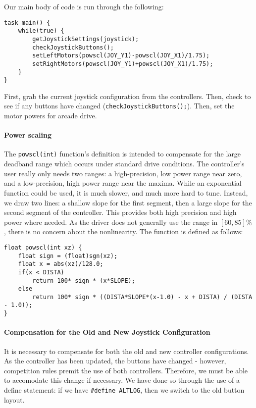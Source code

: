 \documentclass{article}
\begin{document}
Our main body of code is run through the following:

\begin{lstlisting}[tabsize=4]
task main() {
	while(true) {
		getJoystickSettings(joystick);
		checkJoystickButtons();
		setLeftMotors(powscl(JOY_Y1)-powscl(JOY_X1)/1.75);
		setRightMotors(powscl(JOY_Y1)+powscl(JOY_X1)/1.75);
	}
}
\end{lstlisting}

First, grab the current joystick configuration from the controllers. Then, check to see if any buttons have changed (\lstinline{checkJoystickButtons();}{}). Then, set the motor powers for arcade drive. 

\paragraph{Power scaling} The \lstinline{powscl(int)}{} function's definition is intended to compensate for the large deadband range which occurs under standard drive conditions. The controller's user really only needs two ranges: a high-precision, low power range near zero, and a low-precision, high power range near the maxima. While an exponential function could be used, it is much slower, and much more hard to tune. Instead, we draw two lines: a shallow slope for the first segment, then a large slope for the second segment of the controller. This provides both high precision and high power where needed. As the driver does not generally use the range in $[60,85]\%$, there is no concern about the nonlinearity. The function is defined as follows:

\begin{lstlisting}[tabsize=4]
float powscl(int xz) {
	float sign = (float)sgn(xz);
	float x = abs(xz)/128.0;
	if(x < DISTA)
		return 100* sign * (x*SLOPE);
	else
		return 100* sign * ((DISTA*SLOPE*(x-1.0) - x + DISTA) / (DISTA - 1.0));
}
\end{lstlisting}

\paragraph{Compensation for the Old and New Joystick Configuration} It is necessary to compensate for both the old and new controller configurations. As the controller has been updated, the buttons have changed - however, competition rules premit the use of both controllers. Therefore, we must be able to accomodate this change if necessary. We have done so through the use of a define statement: if we have \lstinline{#define ALTLOG}{}, then we switch to the old button layout.
\end{document}

